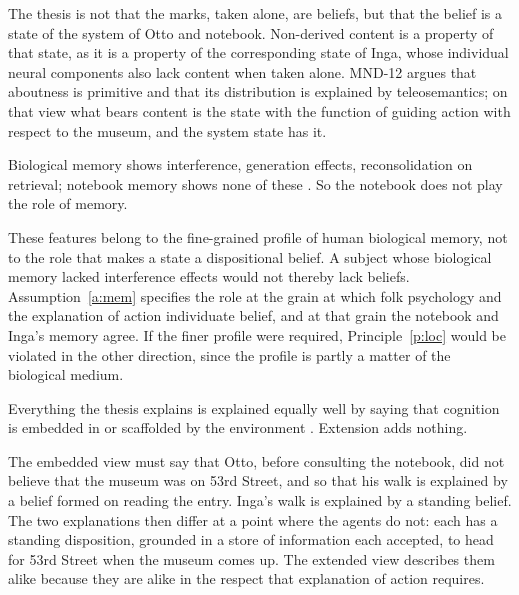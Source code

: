 \documentclass{situationist-preprint}
\begin{document}
\begin{reply}
The thesis is not that the marks, taken alone, are beliefs, but that the belief is a state of the system of Otto and notebook. Non-derived content is a property of that state, as it is a property of the corresponding state of Inga, whose individual neural components also lack content when taken alone. MND-12 argues that aboutness is primitive and that its distribution is explained by teleosemantics; on that view what bears content is the state with the function of guiding action with respect to the museum, and the system state has it.
\end{reply}

\begin{objection}
Biological memory shows interference, generation effects, reconsolidation on retrieval; notebook memory shows none of these \citep{Rupert2004}. So the notebook does not play the role of memory.
\end{objection}

\begin{reply}
These features belong to the fine-grained profile of human biological memory, not to the role that makes a state a dispositional belief. A subject whose biological memory lacked interference effects would not thereby lack beliefs. Assumption~\ref{a:mem} specifies the role at the grain at which folk psychology and the explanation of action individuate belief, and at that grain the notebook and Inga's memory agree. If the finer profile were required, Principle~\ref{p:loc} would be violated in the other direction, since the profile is partly a matter of the biological medium.
\end{reply}

\begin{objection}
Everything the thesis explains is explained equally well by saying that cognition is embedded in or scaffolded by the environment \citep{Sterelny2010}. Extension adds nothing.
\end{objection}

\begin{reply}
The embedded view must say that Otto, before consulting the notebook, did not believe that the museum was on 53rd Street, and so that his walk is explained by a belief formed on reading the entry. Inga's walk is explained by a standing belief. The two explanations then differ at a point where the agents do not: each has a standing disposition, grounded in a store of information each accepted, to head for 53rd Street when the museum comes up. The extended view describes them alike because they are alike in the respect that explanation of action requires.
\end{reply}
\end{document}
